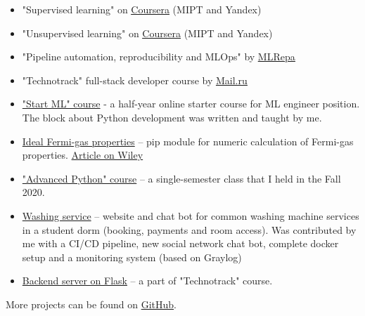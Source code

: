 
\begin{itemize}
	\item "Supervised learning" on \href{https://www.coursera.org/learn/supervised-learning?specialization=machine-learning-data-analysis}{\underline{Coursera}} (MIPT and Yandex)
	\item "Unsupervised learning" on \href{https://www.coursera.org/learn/unsupervised-learning?specialization=machine-learning-data-analysis}{\underline{Coursera}} (MIPT and Yandex)
    \item "Pipeline automation, reproducibility and MLOps" by \href{https://ml-repa.ru/reproducibility-pipelines-automation-mlops}{\underline{MLRepa}}
	\item "Technotrack" full-stack developer course by \href{https://track.mail.ru/}{\underline{Mail.ru}}
\end{itemize}


\begin{itemize}
    \item \href{https://karpov.courses/ml-start}{"Start ML" course} - a half-year online starter course for ML engineer position. The block about Python development was written and taught by me.
    \item \href{https://github.com/alekseik1/ifg-py}{Ideal Fermi-gas properties} -- pip module for numeric calculation of Fermi-gas properties. \href{http://dx.doi.org/10.1002/ctpp.202100139}{Article on Wiley}
    \item \href{https://github.com/alekseik1/advanced_python_1sem_2020}{"Advanced Python" course} -- a single-semester class that I held in the Fall 2020.
    \item \href{https://github.com/alekseik1/drec_stud_site}{Washing service} -- website and chat bot for common washing machine services in a student dorm (booking, payments and room access). Was contributed by me with a CI/CD pipeline, new social network chat bot, complete docker setup and a monitoring system (based on Graylog)
    \item \href{https://github.com/alekseik1/tt-ridesharing-backend}{Backend server on Flask} -- a part of "Technotrack" course.
\end{itemize}
More projects can be found on \href{https://github.com/alekseik1/}{GitHub}.

